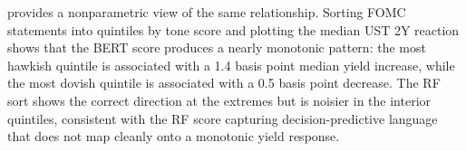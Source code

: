  provides a nonparametric view of the same
relationship. Sorting FOMC statements into quintiles by tone score and
plotting the median UST 2Y reaction shows that the BERT score produces
a nearly monotonic pattern: the most hawkish quintile is associated with
a 1.4 basis point median yield increase, while the most dovish quintile
is associated with a 0.5 basis point decrease. The RF sort shows the
correct direction at the extremes but is noisier in the interior
quintiles, consistent with the RF score capturing decision-predictive
language that does not map cleanly onto a monotonic yield response.


